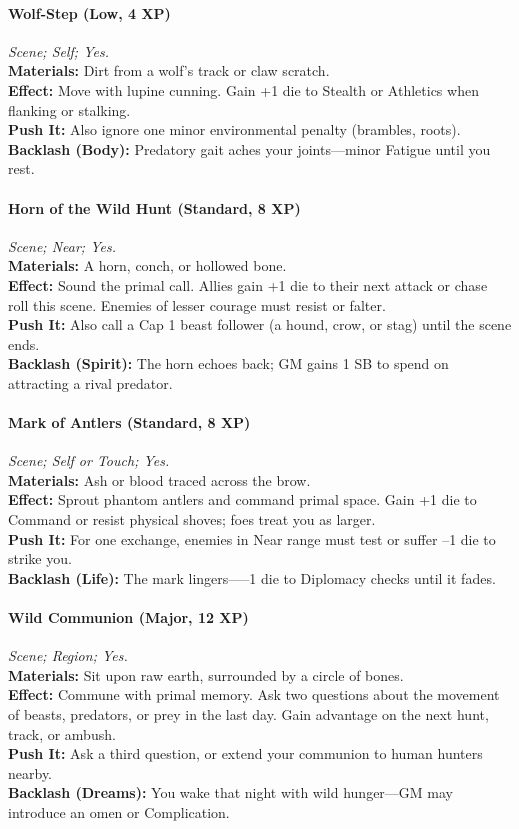 \paragraph{Wolf-Step (Low, 4 XP)} \emph{Scene; Self; Yes.}\\
\textbf{Materials:} Dirt from a wolf’s track or claw scratch.\\
\textbf{Effect:} Move with lupine cunning. Gain +1 die to Stealth or Athletics when flanking or stalking.\\
\textbf{Push It:} Also ignore one minor environmental penalty (brambles, roots).\\
\textbf{Backlash (Body):} Predatory gait aches your joints—minor Fatigue until you rest.

\paragraph{Horn of the Wild Hunt (Standard, 8 XP)} \emph{Scene; Near; Yes.}\\
\textbf{Materials:} A horn, conch, or hollowed bone.\\
\textbf{Effect:} Sound the primal call. Allies gain +1 die to their next attack or chase roll this scene. Enemies of lesser courage must resist or falter.\\
\textbf{Push It:} Also call a Cap 1 beast follower (a hound, crow, or stag) until the scene ends.\\
\textbf{Backlash (Spirit):} The horn echoes back; GM gains 1 SB to spend on attracting a rival predator.

\paragraph{Mark of Antlers (Standard, 8 XP)} \emph{Scene; Self or Touch; Yes.}\\
\textbf{Materials:} Ash or blood traced across the brow.\\
\textbf{Effect:} Sprout phantom antlers and command primal space. Gain +1 die to Command or resist physical shoves; foes treat you as larger.\\
\textbf{Push It:} For one exchange, enemies in Near range must test or suffer --1 die to strike you.\\
\textbf{Backlash (Life):} The mark lingers—--1 die to Diplomacy checks until it fades.

\paragraph{Wild Communion (Major, 12 XP)} \emph{Scene; Region; Yes.}\\
\textbf{Materials:} Sit upon raw earth, surrounded by a circle of bones.\\
\textbf{Effect:} Commune with primal memory. Ask two questions about the movement of beasts, predators, or prey in the last day. Gain advantage on the next hunt, track, or ambush.\\
\textbf{Push It:} Ask a third question, or extend your communion to human hunters nearby.\\
\textbf{Backlash (Dreams):} You wake that night with wild hunger—GM may introduce an omen or Complication.

